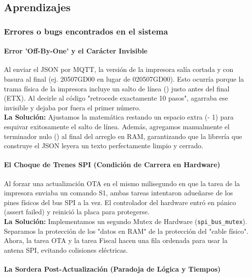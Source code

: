 \documentclass[12pt, a4paper]{article}
\begin{document}
    \subsection*{Aprendizajes}

    {\color{red} \subsubsection*{Errores o bugs encontrados en el sistema}}

    
    \paragraph{Error 'Off-By-One' y el Carácter Invisible}
    
    Al enviar el JSON por MQTT, la versión de la impresora salía cortada y con basura al final (ej. 20507GD00 en lugar de 020507GD00). Esto ocurría porque la trama física de la impresora incluye un salto de línea (\n) justo antes del final (ETX). Al decirle al código "retrocede exactamente 10 pasos", agarraba ese \n invisible y dejaba por fuera el primer número.\\

    \textbf{La Solución:} Ajustamos la matemática restando un espacio extra (- 1) para esquivar exitosamente el salto de línea. Además, agregamos manualmente el terminador nulo (\0) al final del arreglo en RAM, garantizando que la librería que construye el JSON leyera un texto perfectamente limpio y cerrado.

    \paragraph{El Choque de Trenes SPI (Condición de Carrera en Hardware)}
    
    Al forzar una actualización OTA en el mismo milisegundo en que la tarea de la impresora enviaba un comando S1, ambas tareas intentaron adueñarse de los pines físicos del bus SPI a la vez. El controlador del hardware entró en pánico (assert failed) y reinició la placa para protegerse.\\

    \textbf{La Solución:} Implementamos un segundo Mutex de Hardware (\texttt{spi\_bus\_mutex}). Separamos la protección de los "datos en RAM" de la protección del "cable físico". Ahora, la tarea OTA y la tarea Fiscal hacen una fila ordenada para usar la antena SPI, evitando colisiones eléctricas.

    \paragraph{La Sordera Post-Actualización (Paradoja de Lógica y Tiempos)}
    
\end{document}
